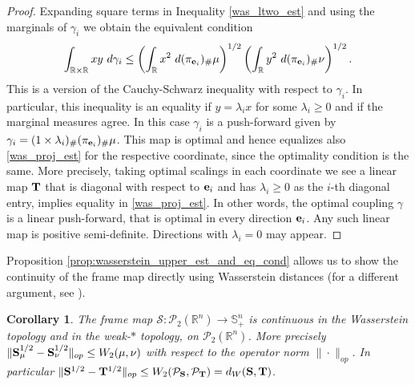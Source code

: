 \documentclass{amsart}
\numberwithin{equation}{section}
\newcommand\cP{{\mathcal P}}
\newcommand\bS{{\bf S}}
\newcommand\bT{{\bf T}}
\newcommand\R{{\mathbb R}}
\theoremstyle{plain}
\newtheorem{corollary}[subsection]{Corollary}
\theoremstyle{definition}
\begin{document}
\begin{proof}
Expanding square terms in Inequality \ref{was_ltwo_est} and using the marginals of $\gamma_i$ we obtain the equivalent condition   
\[
\int_{\R \times \R} xy \  d\gamma_i \leq \left(\int_{\R} x^2\ d(\pi_{{\bf e}_i})_{\#}\mu\right)^{1/2} \left(\int_{\R} y^2\ d (\pi_{{\bf e}_i})_{\#}\nu \right)^{1/2}. 
\]
This is a version of the Cauchy-Schwarz inequality with respect to $\gamma_i$. In particular, this inequality is an equality if $y=\lambda_i x$ for some $\lambda_i \geq 0$ and if the marginal measures agree. In this case $\gamma_i$ is a push-forward given by $\gamma_i=(1 \times \lambda_i )_{\#}(\pi_{{\bf e}_i})_{\#}\mu$. This map is optimal and hence equalizes also \ref{was_proj_est} for the respective coordinate, since the optimality condition is the same.  
More precisely, taking optimal scalings in each coordinate we see a linear map $\bT$ that is diagonal with respect to ${\bf e}_i$ and    
has $\lambda_i\geq 0$ as the $i$-th diagonal entry, implies equality in \ref{was_proj_est}. In other words, the optimal coupling $\gamma$ is a linear push-forward, that is optimal in every direction ${\bf e}_i$. Any such linear map is positive semi-definite. Directions with $\lambda_i=0$ may appear.  
\end{proof}
Proposition \ref{prop:wasserstein_upper_est_and_eq_cond} allows us to show the continuity of the frame map directly using Wasserstein distances (for a different argument, see \cite{wickman2023gradient}). 
\begin{corollary}\label{cor_continuity_fr_map}
 The frame map $\mathcal{S}: \cP_2(\mathbb{R}^n) \rightarrow {\mathbb S}^n_+$ is continuous in the Wasserstein topology and in the weak-$\ast$ topology, on $\mathcal{P}_2(\R^n)$. More precisely  
 $ \|{\bf S}^{1/2}_{\mu}-{\bf S}^{1/2}_{\nu}\|_{op}  \leq  W_2(\mu,\nu) $ with respect to the operator norm $\|\cdot\|_{op}$.    
 In particular $ \|{\bf S}^{1/2}-{\bf T}^{1/2} \|_{op}  \leq  W_2(\cP_{\bS},\cP_{\bT})=d_W(\bS,\bT) $.
\end{corollary}
\end{document}
